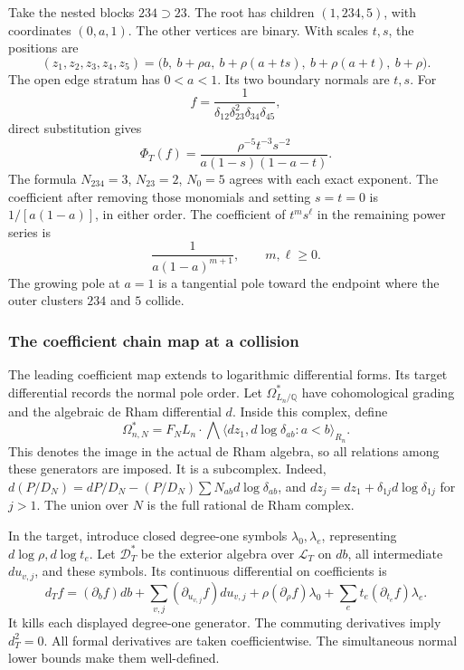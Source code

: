 \begin{example}\label{gf:ex:gf-nested}
Take the nested blocks \(234\supset23\).  The root has
children \((1,234,5)\), with coordinates \((0,a,1)\).
The other vertices are binary.  With scales \(t,s\), the positions are
\[
 (z_1,z_2,z_3,z_4,z_5)=
 \bigl(b,\ b+\rho a,\ b+\rho(a+ts),\ b+\rho(a+t),\ b+\rho\bigr).
\]
The open edge stratum has \(0<a<1\).  Its two boundary normals
are \(t,s\).  For
\[
 f=\frac1{\delta_{12}\delta_{23}^2\delta_{34}\delta_{45}},
\]
direct substitution gives
\begin{equation}\label{gf:eq:gf-example}
 \Phi_T(f)=\frac{\rho^{-5}t^{-3}s^{-2}}
                  {a(1-s)(1-a-t)}.
\end{equation}
The formula \(N_{234}=3\), \(N_{23}=2\), \(N_0=5\)
agrees with each exact exponent.
The coefficient after removing those monomials and setting
\(s=t=0\) is \(1/[a(1-a)]\), in either order.
The coefficient of \(t^ms^\ell\) in the remaining power series is
\[
 \frac1{a(1-a)^{m+1}},\qquad m,\ell\geq0.
\]
The growing pole at \(a=1\) is a tangential pole toward the
endpoint where the outer clusters \(234\) and \(5\) collide.
\end{example}

\subsubsection{The coefficient chain map at a collision}

The leading coefficient map extends to logarithmic differential forms.
Its target differential records the normal pole order.
Let \(\Omega^*_{L_n/\mathbb Q}\) have cohomological grading and
the algebraic de Rham differential \(d\).
Inside this complex, define
\[
 \Omega^*_{n,N}=
 F_NL_n\cdot
 \bigwedge\!\langle dz_1,d\log\delta_{ab}:a<b\rangle_{R_n}.
\]
This denotes the image in the actual de Rham algebra, so all
relations among these generators are imposed.
It is a subcomplex.  Indeed,
\(d(P/D_N)=dP/D_N-(P/D_N)\sum N_{ab}d\log\delta_{ab}\),
and
\(dz_j=dz_1+\delta_{1j}d\log\delta_{1j}\) for \(j>1\).
The union over \(N\) is the full rational de Rham complex.

In the target, introduce closed degree-one symbols
\(\lambda_0,\lambda_e\), representing \(d\log\rho,d\log t_e\).
Let \(\mathscr D_T^*\) be the exterior algebra over
\(\mathscr L_T\) on \(db\), all intermediate \(du_{v,j}\),
and these symbols.  Its continuous differential on coefficients is
\[
 d_Tf=(\partial_bf)db+
 \sum_{v,j}(\partial_{u_{v,j}}f)du_{v,j}
 +\rho(\partial_\rho f)\lambda_0
 +\sum_e t_e(\partial_{t_e}f)\lambda_e.
\]
It kills each displayed degree-one generator.
The commuting derivatives imply \(d_T^2=0\).
All formal derivatives are taken coefficientwise.
The simultaneous normal lower bounds make them well-defined.

